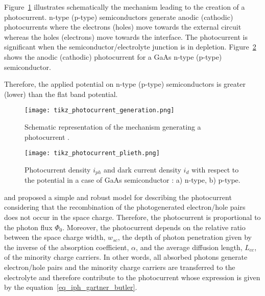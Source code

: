     Figure~\ref{fig_photocurrent_generation} illustrates schematically the 
    mechanism leading to the creation of a photocurrent. n-type (p-type) 
    semiconductors generate anodic (cathodic) photocurrents where the 
    electrons (holes) move towards the external circuit whereas the holes (electrons) 
    move towards the interface. 
    The photocurrent is significant when the semiconductor/electrolyte junction 
    is in depletion. 
    Figure~\ref{fig_photocurrent_plieth} shows the anodic (cathodic) photocurrent 
    for a GaAs n-type (p-type) semiconductor.

    Therefore, the applied potential on n-type (p-type) semiconductors is 
    greater (lower) than the flat band potential. 

    \begin{figure}[h]
        \centering
        \texttt{[image: tikz\_photocurrent\_generation.png]}
        \caption{Schematic representation of the mechanism generating 
        a photocurrent \citep{memming2008,bard2002}.}
        \label{fig_photocurrent_generation}
    \end{figure}

    \begin{figure}[h]
        \centering
        \texttt{[image: tikz\_photocurrent\_plieth.png]}
        \caption{Photocurrent density $i_{ph}$ and dark current density 
        $i_d$ with respect to the potential in a case of GaAs semiconductor 
        \citep{plieth2008}: a) n-type, b) p-type.}
        \label{fig_photocurrent_plieth}
    \end{figure}

    \citet{gartner1959} and \citet{butler1977}  
    proposed a simple and robust model for 
    describing the photocurrent considering that the recombination of the 
    photogenerated electron/hole pairs does not occur in the space charge. 
    Therefore, the photocurrent is proportional to the photon flux $\Phi _0$. 
    Moreover, the photocurrent depends on the relative ratio between the space 
    charge width, $w_{sc}$, the depth of photon penetration given by the inverse 
    of the absorption coefficient, $ \alpha $, and the average diffusion length, 
    $L_{cc}$, of the minority charge carriers. 
    In other words, all absorbed photons generate electron/hole pairs and 
    the minority charge carriers are transferred to the electrolyte and 
    therefore contribute to the photocurrent whose expression is given 
    by the equation~\ref{eq_iph_gartner_butler}.

